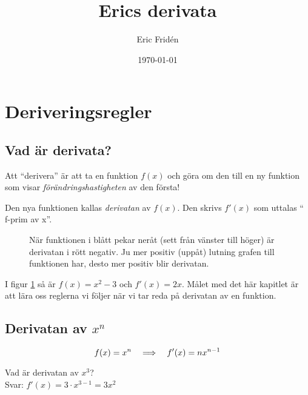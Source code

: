 \documentclass[a4paper, 12pt]{article}
\title{Erics derivata}
\author{Eric Fridén}
\date{\today}
\begin{document}
\doublespacing
\maketitle

\section{Deriveringsregler}

\subsection{Vad är derivata?}

Att ``derivera'' är att ta en funktion $f(x)$ och göra om den till en ny funktion som visar \emph{förändringshastigheten} av den första!

Den nya funktionen kallas \emph{derivatan} av $f(x)$. Den skrivs $f'(x)$ som uttalas `` f-prim av x''.

\begin{figure}[h]
    \centering
    \caption{När funktionen i blått pekar neråt (sett från vänster till höger) är derivatan i rött negativ. Ju mer positiv (uppåt) lutning grafen till funktionen har, desto mer positiv blir derivatan.}
    \label{fig:1}
\end{figure}

I figur \ref{fig:1} så är $f(x) = x^2 - 3$ och $f'(x) = 2x$. Målet med det här kapitlet är att lära oss reglerna vi följer när vi tar reda på derivatan av en funktion.


\subsection{Derivatan av $x^n$}

\begin{regel}
    \label{reg:x^n}
    \[f(x) = x^n \hspace{1em} \Longrightarrow \hspace{1em} f'(x) = nx^{n-1}\]
\end{regel}

\begin{exempel}
    Vad är derivatan av $x^3$?\\
    Svar: $f'(x) = 3\cdot x^{3-1} = 3x^2$
\end{exempel}
\end{document}
